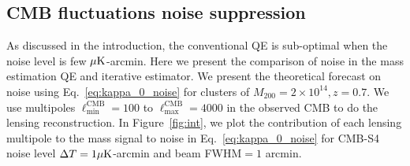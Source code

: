 \documentclass[prd, superscriptaddress, tightenlines, longbibliography, nofootinbib, eqsecnum, amsfonts, amsmath, floatfix, twocolumn, notitlepage]{revtex4-2}
\begin{document}
\subsection{CMB fluctuations noise suppression}

As discussed in the introduction, the conventional QE is sub-optimal when the noise level is few $\mu \rm{K}$-arcmin. Here we present the comparison of noise in the mass estimation QE and iterative estimator. We present the theoretical forecast on noise using Eq.~\ref{eq:kappa_0_noise} for clusters of $M_{200} = 2\times 10^{14}, z=0.7$. We use multipoles $\ell_{\text{min}}^{\text{CMB}} = 100$ to $\ell_{\text{max}}^{\text{CMB}} = 4000$ in the observed CMB to do the lensing reconstruction. 
In Figure~\ref{fig:int}, we plot the contribution of each lensing multipole to the mass signal to noise in Eq.~\ref{eq:kappa_0_noise} for CMB-S4 noise level $\Delta T  = 1 \mu \rm{K}$-arcmin and beam FWHM$=1$ arcmin. 

\end{document}
